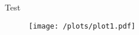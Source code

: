 \documentclass{scrartcl}
\begin{document}
Test
\begin{figure}
  \centering
  \texttt{[image: /plots/plot1.pdf]}
\end{figure}
\end{document}
